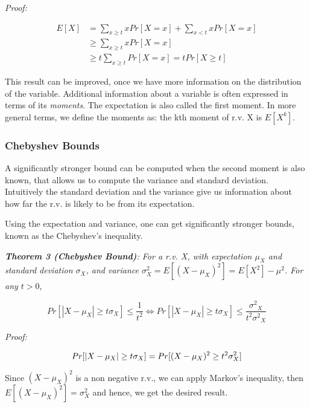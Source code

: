 \documentclass[11pt]{article}
\begin{document}
\emph{Proof:} 

\begin{equation}
\begin{split}
  E[X] &= \sum_{x \geq t} x Pr[X = x] + \sum_{x < t} x Pr[X = x] \\
       &\geq \sum_{x \geq t} x Pr[X = x] \\
       &\geq t \sum_{x \geq t} Pr[X = x] = t Pr[X \geq t] 
\end{split}       
\end{equation}

This result can be improved, once we have more information on the distribution of the variable. Additional information about a variable is often expressed in terms of its \textit{moments}. The expectation is also called the first moment. In more general terms, we define the moments as: the kth moment of r.v. X is $E[X^k]$.

\subsubsection{Chebyshev Bounds}
A significantly stronger bound can be computed when the second moment is also known, that allows us to compute the variance and standard deviation. Intuitively the standard deviation and the variance give us information about how far the r.v. is likely to be from its expectation.

Using the expectation and variance, one can get significantly stronger bounds, known as the Chebyshev's inequality. 

\medskip
\textit{\textbf{Theorem 3 (Chebyshev Bound)}: For a r.v. X, with expectation $\mu_X$ and standard deviation $\sigma_X$, and variance $\sigma_X^2 = E[(X - \mu_X)^2] = E[X^2] - \mu^2$. For any $t > 0$}, 

\begin{equation}
  Pr[|X - \mu_X| \geq t\sigma_X] \leq \frac{1}{t^2} \Leftrightarrow  Pr[|X - \mu_X| \geq t\sigma_X] \leq \frac{{\sigma^2}_X}{t^2{\sigma^2}_X}
\end{equation}

\emph{Proof:} 

\begin{equation}
  Pr[|X - \mu_X | \geq t\sigma_X] = Pr[(X - \mu_X)^2 \geq t^2 \sigma_X^2]\\
\end{equation}

Since $(X-\mu_X)^2$ is a non negative r.v., we can apply Markov's inequality, then $E[(X-\mu_X)^2] = \sigma_X^2$ and hence, we get the desired result. 
\end{document}
